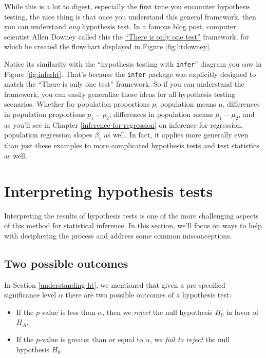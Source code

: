 \documentclass[
]{book}
\providecommand{\tightlist}{%
  \setlength{\itemsep}{0pt}\setlength{\parskip}{0pt}}
\begin{document}
While this is a lot to digest, especially the first time you encounter hypothesis testing, the nice thing is that once you understand this general framework, then you can understand \emph{any} hypothesis test. In a famous blog post, computer scientist Allen Downey called this the \href{http://allendowney.blogspot.com/2016/06/there-is-still-only-one-test.html}{``There is only one test''} framework, for which he created the flowchart displayed in Figure \ref{fig:htdowney}.

Notice its similarity with the ``hypothesis testing with \texttt{infer}'' diagram you saw in Figure \ref{fig:inferht}. That's because the \texttt{infer} package was explicitly designed to match the ``There is only one test'' framework. So if you can understand the framework, you can easily generalize these ideas for all hypothesis testing scenarios. Whether for population proportions \(p\), population means \(\mu\), differences in population proportions \(p_1 - p_2\), differences in population means \(\mu_1 - \mu_2\), and as you'll see in Chapter \ref{inference-for-regression} on inference for regression, population regression slopes \(\beta_1\) as well. In fact, it applies more generally even than just these examples to more complicated hypothesis tests and test statistics as well.

\hypertarget{ht-interpretation}{%
\section{Interpreting hypothesis tests}\label{ht-interpretation}}

Interpreting the results of hypothesis tests is one of the more challenging aspects of this method for statistical inference. In this section, we'll focus on ways to help with deciphering the process and address some common misconceptions.

\hypertarget{trial}{%
\subsection{Two possible outcomes}\label{trial}}

In Section \ref{understanding-ht}, we mentioned that given a pre-specified significance level \(\alpha\) there are two possible outcomes of a hypothesis test:

\begin{itemize}
\tightlist
\item
  If the \(p\)-value is less than \(\alpha\), then we \emph{reject} the null hypothesis \(H_0\) in favor of \(H_A\).
\item
  If the \(p\)-value is greater than or equal to \(\alpha\), we \emph{fail to reject} the null hypothesis \(H_0\).
\end{itemize}
\end{document}
